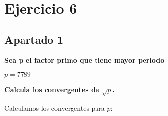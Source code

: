\documentclass[a4paper]{article}
\title {\fbox{\Huge{\textbf{Ejercicio 6}}}}
\author {\fbox{Ana Buendía Ruiz-Azuaga}}
\begin{document}
\maketitle


\section{Ejercicio 6}

\subsection{Apartado 1}

\textbf{Sea p el factor primo que tiene mayor periodo}

$p = 7789$

\textbf{Calcula los convergentes de $\sqrt{p}$.}

Calculamos los convergentes para $p$:
\end{document}
